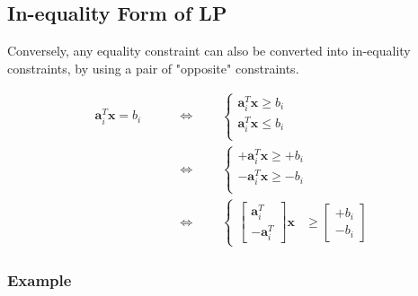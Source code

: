 \documentclass[twocolumn]{ctexart}
\begin{document}
\subsection{In-equality Form of LP}

Conversely,
any equality constraint can also be converted into in-equality constraints,
by using a pair of "opposite" constraints.

\begin{equation}
    \begin{aligned}
        \label{eq:cons_equal_to_inequal}
        \mathbf{a}_i^T  \mathbf{x}  =  b_i
        & \qquad \Leftrightarrow \qquad
        \begin{cases}
            \mathbf{a}_i^T \mathbf{x}  \geq  b_i \\
            \mathbf{a}_i^T \mathbf{x}  \leq  b_i \\
        \end{cases}
        \\
        & \qquad \Leftrightarrow \qquad
        \begin{cases}
            +\mathbf{a}_i^T \mathbf{x}  \geq  +b_i \\
            -\mathbf{a}_i^T \mathbf{x}  \geq  -b_i \\
        \end{cases}
        \\
        & \qquad \Leftrightarrow \qquad
        \begin{cases}
            \begin{bmatrix}  \mathbf{a}_i^T  \\  -\mathbf{a}_i^T  \end{bmatrix}
            \mathbf{x}
            &\geq
            \begin{bmatrix}  +b_i  \\  -b_i  \end{bmatrix}
        \end{cases}
    \end{aligned}
\end{equation}



\subsubsection{Example}
\end{document}
